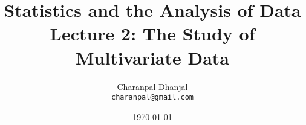 \documentclass{beamer}
\title{Statistics and the Analysis of Data\\ Lecture 2: The Study of Multivariate Data}
\author{Charanpal Dhanjal \\ \texttt{charanpal@gmail.com}}
\institute{\'{E}cole des Ponts}
\date{\today}
\begin{document}
\frame{\titlepage}
\end{document}
